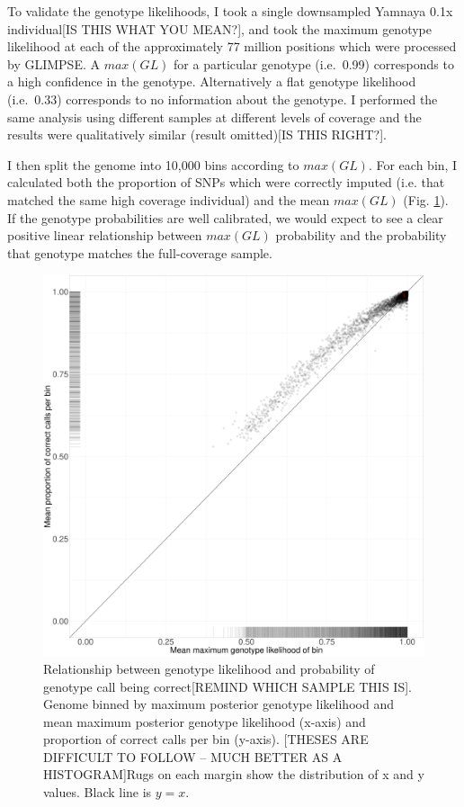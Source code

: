 To validate the genotype likelihoods, I took {\color{red}a single downsampled Yamnaya 0.1x individual[IS THIS WHAT YOU MEAN?]}, and took the maximum genotype likelihood at each of the approximately 77 million positions which were processed by GLIMPSE. A $max(GL)$ for a particular genotype (i.e.\ 0.99) corresponds to a high confidence in the genotype. Alternatively a flat genotype likelihood (i.e.\ 0.33) corresponds to no information about the genotype. I performed the same analysis using different samples at different levels of coverage and the results were qualitatively similar {\color{red}(result omitted)[IS THIS RIGHT?]}.

I then split the genome into 10,000 bins according to $max(GL)$. For each bin, I calculated both the proportion of SNPs which were correctly imputed (i.e. that matched the same high coverage individual) and the mean $max(GL)$ (Fig. \ref{fig:Yamnaya_0.1x_GL_calibration}). If the genotype probabilities are well calibrated, we would expect to see a clear positive linear relationship between $max(GL)$ probability and the probability that genotype matches the full-coverage sample.  

\begin{figure}[htp]
    \centering
    \includegraphics[width=1.0\textwidth]{../images/chapter1/Yamnaya_0.1x_bin.pdf}
    \caption{Relationship between genotype likelihood and probability of genotype call being correct{\color{red}[REMIND WHICH SAMPLE THIS IS]}. Genome binned by maximum posterior genotype likelihood and mean maximum posterior genotype likelihood (x-axis) and proportion of correct calls per bin (y-axis). {\color{red}[THESES ARE DIFFICULT TO FOLLOW -- MUCH BETTER AS A HISTOGRAM]Rugs on each margin show the distribution of x and y values.} Black line is $y=x$.}
    \label{fig:Yamnaya_0.1x_GL_calibration}
\end{figure}

